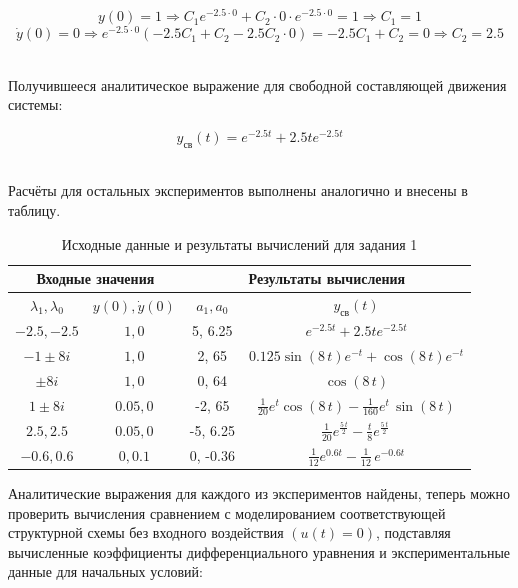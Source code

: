 \documentclass[a4paper]{article}
\begin{document}
$$
y(0) = 1 \Rightarrow C_1e^{-2.5 \cdot 0} + C_2 \cdot0 \cdot e^{-2.5 \cdot 0} = 1 \Rightarrow C_1 = 1
$$
$$
\dot{y}(0) = 0 \Rightarrow e^{-2.5\cdot 0}(-2.5C_1 + C_2-2.5C_2\cdot 0)= -2.5C_1 + C_2=0 \Rightarrow C_2 = 2.5
$$\ 

Получившееся аналитическое выражение для свободной составляющей движения системы:

$$y_{\text{св}}(t) = e^{-2.5t} + 2.5te^{-2.5t}$$\

Расчёты для остальных экспериментов выполнены аналогично и внесены в таблицу.\
\renewcommand{\arraystretch}{1.5}
\begin{table}[H]
    \centering
    \begin{tabular}{|c|c|c|c|}
      \hline
      \multicolumn{2}{|c|}{Входные значения} & \multicolumn{2}{|c|}{Результаты вычисления} \\
      \hline
      $\lambda_1, \lambda_0$ & $y(0), \dot{y}(0)$ & $
      a_1, a_0$ & $y_{\text{св}}(t)$ \\
      \hline
      $-2.5, -2.5$ & $1, 0$ & 5, 6.25 & $e^{-2.5t} + 2.5te^{-2.5t}$ \\
      \hline
      $-1 \pm 8i$ & $1, 0$ & 2, 65 & $0.125\sin\left(8\,t\right)e^{-t}+\cos\left(8\,t\right)e^{-t}$ \\
      \hline
      $\pm 8i$ & $1, 0$ & 0, 64 & $\cos\left(8\,t\right)$ \\
      \hline
      $1 \pm 8i$ & $0.05, 0$ & -2, 65 & $\frac{1}{20}{e}^{t}\cos\left(8\,t\right)-\frac{1}{160}{e}^{t}\,\sin\left(8\,t\right)$ \\
      \hline
      $2.5, 2.5$ & $0.05, 0$ & -5, 6.25 & $\frac{1}{20}{e}^{\frac{5\,t}{2}}-\frac{t}{8}{e}^{\frac{5\,t}{2}}\,$ \\
      \hline
      $-0.6, 0.6$ & $0, 0.1$ & 0, -0.36 & $\frac{1}{12}{e}^{0.6t}-\frac{1}{12}\,{e}^{-0.6t}$ \\
      \hline
    \end{tabular}
    \caption{Исходные данные и результаты вычислений для задания 1}
\end{table}

Аналитические выражения для каждого из экспериментов найдены, теперь можно проверить вычисления сравнением с моделированием соответствующей структурной схемы без входного воздействия $(u(t) = 0)$, подставляя вычисленные коэффициенты дифференциального уравнения и экспериментальные данные для начальных условий:
\end{document}
